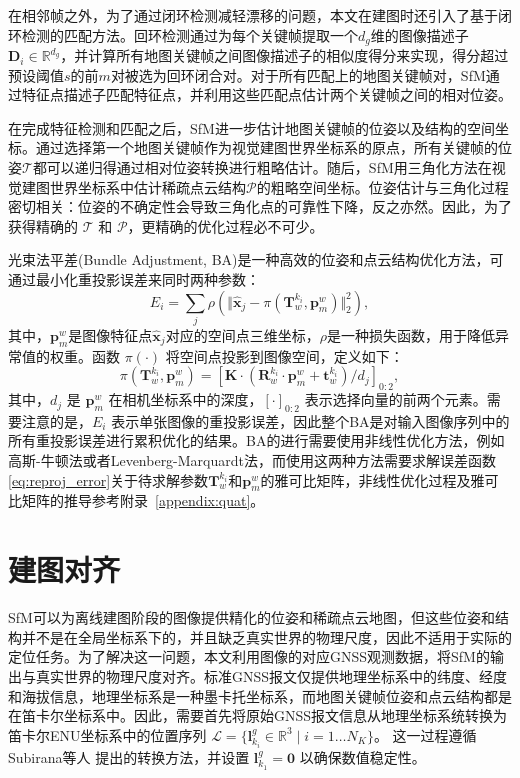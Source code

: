 在相邻帧之外，为了通过闭环检测减轻漂移的问题，本文在建图时还引入了基于闭环检测的匹配方法。回环检测通过为每个关键帧提取一个$d_g$维的图像描述子$\mathbf{D}_i \in \mathbb{R}^{d_g}$，并计算所有地图关键帧之间图像描述子的相似度得分来实现，得分超过预设阈值$s$的前$m$对被选为回环闭合对。对于所有匹配上的地图关键帧对，SfM通过特征点描述子匹配特征点，并利用这些匹配点估计两个关键帧之间的相对位姿。

在完成特征检测和匹配之后，SfM进一步估计地图关键帧的位姿以及结构的空间坐标。通过选择第一个地图关键帧作为视觉建图世界坐标系的原点，所有关键帧的位姿$\mathcal{T}$都可以递归得通过相对位姿转换进行粗略估计。随后，SfM用三角化方法在视觉建图世界坐标系中估计稀疏点云结构$\mathcal{P}$的粗略空间坐标。位姿估计与三角化过程密切相关：位姿的不确定性会导致三角化点的可靠性下降，反之亦然。因此，为了获得精确的 $\mathcal{T}$ 和 $\mathcal{P}$，更精确的优化过程必不可少。

光束法平差(Bundle Adjustment, BA)是一种高效的位姿和点云结构优化方法，可通过最小化重投影误差来同时两种参数：
\begin{equation}
\label{eq:reproj_error}
E_i = \sum_{j}\rho(\Vert \hat{\mathbf{x}}_j - \pi(\mathbf{T}^{k_i}_w, \mathbf{p}_{m}^{w}) \Vert ^2_2),
\end{equation}
其中，$\mathbf{p}_{m}^{w}$是图像特征点$\hat{\mathbf{x}}_j$对应的空间点三维坐标，$\rho$是一种损失函数，用于降低异常值的权重。函数 $\pi(\cdot)$ 将空间点投影到图像空间，定义如下：
\begin{equation}
\label{eq:proj_func}
\pi(\mathbf{T}^{k_i}_w, \mathbf{p}_{m}^{w}) = [\mathbf{K}\cdot(\mathbf{R}_w^{k_i}\cdot\mathbf{p}_{m}^{w}+\mathbf{t}_w^{k_i})/d_j]_{0:2},
\end{equation}
其中，$d_j$ 是 $\mathbf{p}_{m}^{w}$ 在相机坐标系中的深度，$[\cdot]_{0:2}$ 表示选择向量的前两个元素。需要注意的是，$E_i$ 表示单张图像的重投影误差，因此整个BA是对输入图像序列中的所有重投影误差进行累积优化的结果。BA的进行需要使用非线性优化方法，例如高斯-牛顿法或者Levenberg-Marquardt法，而使用这两种方法需要求解误差函数\ref{eq:reproj_error}关于待求解参数$\mathbf{T}^{k_i}_w$和$\mathbf{p}_{m}^{w}$的雅可比矩阵，非线性优化过程及雅可比矩阵的推导参考附录~\ref{appendix:quat}。


\section{建图对齐}

SfM可以为离线建图阶段的图像提供精化的位姿和稀疏点云地图，但这些位姿和结构并不是在全局坐标系下的，并且缺乏真实世界的物理尺度，因此不适用于实际的定位任务。为了解决这一问题，本文利用图像的对应GNSS观测数据，将SfM的输出与真实世界的物理尺度对齐。标准GNSS报文仅提供地理坐标系中的纬度、经度和海拔信息，地理坐标系是一种墨卡托坐标系，而地图关键帧位姿和点云结构都是在笛卡尔坐标系中。因此，需要首先将原始GNSS报文信息从地理坐标系统转换为笛卡尔ENU坐标系中的位置序列
$\mathcal{L} = \{\mathbf{l}_{k_i}^g \in \mathbb{R}^3 \mid i=1 \ldots N_K \}$。
这一过程遵循Subirana等人 \cite{subirana2011transformations} 提出的转换方法，并设置
$\mathbf{l}_{k_1}^g = \mathbf{0}$ 以确保数值稳定性。


